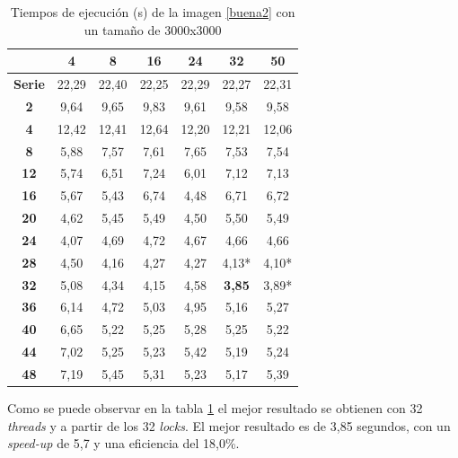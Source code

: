 \begin{table}[H]
	\centering
	\small
	\begin{tabular}{|c|c|c|c|c|c|c|}
		\hline
		{\bf \backslashbox{Threads}{Locks}}   & {\bf 4} & {\bf 8} & {\bf 16} & {\bf 24} & {\bf 32} & {\bf 50} \\ \hline
		{\bf Serie}  & 22,29   & 22,40   & 22,25    & 22,29    & 22,27    & 22,31    \\ \hline
		{\bf 2}  & 9,64    & 9,65    & 9,83     & 9,61     & 9,58     & 9,58     \\ \hline
		{\bf 4}  & 12,42   & 12,41   & 12,64    & 12,20    & 12,21    & 12,06    \\ \hline
		{\bf 8}  & 5,88    & 7,57    & 7,61     & 7,65     & 7,53     & 7,54     \\ \hline
		{\bf 12} & 5,74    & 6,51    & 7,24     & 6,01     & 7,12     & 7,13     \\ \hline
		{\bf 16} & 5,67    & 5,43    & 6,74     & 4,48     & 6,71     & 6,72     \\ \hline
		{\bf 20} & 4,62    & 5,45    & 5,49     & 4,50     & 5,50     & 5,49     \\ \hline
		{\bf 24} & 4,07    & 4,69    & 4,72     & 4,67     & 4,66     & 4,66     \\ \hline
		{\bf 28} & 4,50    & 4,16    & 4,27     & 4,27     & 4,13*     & 4,10*     \\ \hline
		{\bf 32} & 5,08    & 4,34    & 4,15     & 4,58     & \textbf{3,85}     & 3,89*     \\ \hline
		{\bf 36} & 6,14    & 4,72    & 5,03     & 4,95     & 5,16     & 5,27     \\ \hline
		{\bf 40} & 6,65    & 5,22    & 5,25     & 5,28     & 5,25     & 5,22     \\ \hline
		{\bf 44} & 7,02    & 5,25    & 5,23     & 5,42     & 5,19     & 5,24     \\ \hline
		{\bf 48} & 7,19    & 5,45    & 5,31     & 5,23     & 5,17     & 5,39     \\ \hline
	\end{tabular}
	\captionsetup{justification=centering}	
	\caption{Tiempos de ejecuci\'{o}n (s) de la imagen \ref{buena2} con un tama\~{n}o de 3000x3000}
	\label{img2-3000}
\end{table}

Como se puede observar en la tabla \ref{img2-3000} el mejor resultado se obtienen con 32 \textit{threads} y a partir de los 32 \textit{locks}. El mejor resultado es de 3,85 segundos, con un \textit{speed-up} de 5,7 y una eficiencia del 18,0\%.  

